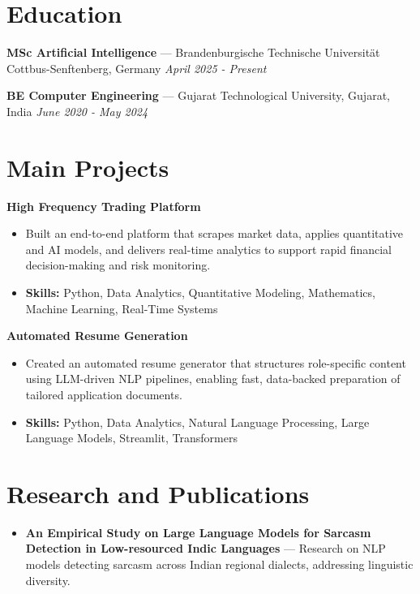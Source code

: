 \documentclass[a4paper,10pt]{article}
\begin{document}
\section*{Education}
\textbf{MSc Artificial Intelligence} — Brandenburgische Technische Universität Cottbus-Senftenberg, Germany \hfill \textit{April 2025 - Present}\par
\vspace{1.5pt}
\textbf{BE Computer Engineering} — Gujarat Technological University, Gujarat, India \hfill \textit{June 2020 - May 2024}\par

\section*{Main Projects}
\textbf{High Frequency Trading Platform}\par
\vspace{1pt}
\begin{itemize}
  \item Built an end-to-end platform that scrapes market data, applies quantitative and AI models, and delivers real-time analytics to support rapid financial decision-making and risk monitoring.
  \item \textbf{Skills:} Python, Data Analytics, Quantitative Modeling, Mathematics, Machine Learning, Real-Time Systems
\end{itemize}
\vspace{3pt}
\textbf{Automated Resume Generation}\par
\vspace{1pt}
\begin{itemize}
  \item Created an automated resume generator that structures role-specific content using LLM-driven NLP pipelines, enabling fast, data-backed preparation of tailored application documents.
  \item \textbf{Skills:} Python, Data Analytics, Natural Language Processing, Large Language Models, Streamlit, Transformers
\end{itemize}

\section*{Research and Publications}
\begin{itemize}
\item \textbf{An Empirical Study on Large Language Models for Sarcasm Detection in Low-resourced Indic Languages} — Research on NLP models detecting sarcasm across Indian regional dialects, addressing linguistic diversity.
\end{itemize}
\end{document}
